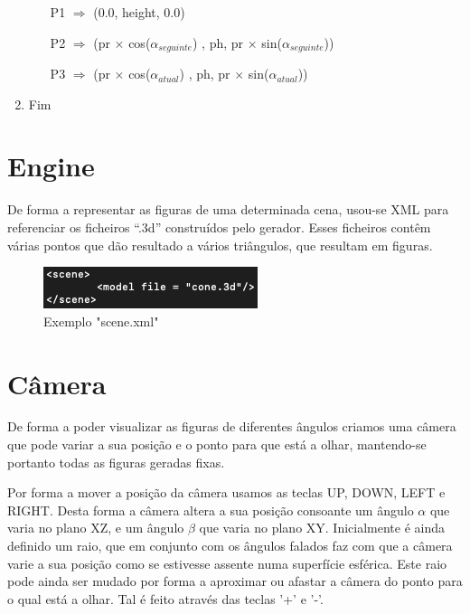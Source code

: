 \documentclass[a4paper]{article}
\begin{document}
\begin{enumerate}
\begin{enumerate}
        \hspace{3cm} P1 $\Rightarrow$ (0.0, height, 0.0)

    \vspace{0.2cm}

        \hspace{0.5cm} P2 $\Rightarrow$ (pr $\times$ cos($\alpha_{seguinte}$) , ph, pr $\times$ sin($\alpha_{seguinte}$))

    \vspace{0.2cm}

        \hspace{1cm} P3 $\Rightarrow$ (pr $\times$ cos($\alpha_{atual}$) , ph, pr $\times$ sin($\alpha_{atual}$))

    \vspace{0.3cm}

  \end{enumerate}

  \item Fim
\end{enumerate}
\rmfamily


\newpage

\section{Engine}
\label{sec:engine}
De forma a representar as figuras de uma determinada cena, usou-se XML para referenciar os ficheiros “.3d” construídos pelo gerador. Esses ficheiros contêm várias pontos que dão resultado a vários triângulos, que resultam em figuras.

\begin{figure}[H]
\centering
\includegraphics[scale=0.70]{scene_xml.png}
\caption{Exemplo "scene.xml"}
\label{img:scene}
\end{figure}

\section{Câmera}
\label{sec:camera}
De forma a poder visualizar as figuras de diferentes ângulos criamos uma câmera que pode variar a sua posição e o ponto para que está a olhar, mantendo-se portanto todas as figuras geradas fixas.

Por forma a mover a posição da câmera usamos as teclas UP, DOWN, LEFT e RIGHT. Desta forma a câmera altera a sua posição consoante um ângulo $\alpha$ que varia no plano XZ, e um ângulo $\beta$ que varia no plano XY. Inicialmente é ainda definido um raio, que em conjunto com os ângulos falados faz com que a câmera varie a sua posição como se estivesse assente numa superfície esférica. Este raio pode ainda ser mudado por forma a aproximar ou afastar a câmera do ponto para o qual está a olhar. Tal é feito através das teclas '+' e '-'.
\end{document}
